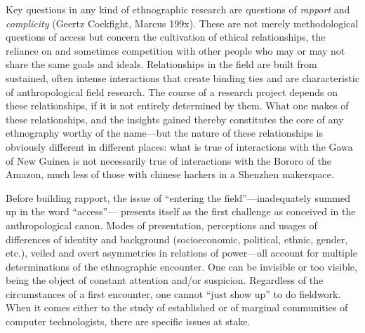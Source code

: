 \documentclass[10pt,letter,oneside]{scrartcl}
\begin{document}


Key questions in any kind of ethnographic research are questions of
\emph{rapport} and \emph{complicity} (Geertz Cockfight, Marcus 199x).  These are not
merely methodological questions of access but concern the cultivation
of ethical relationships, the reliance on and sometimes competition
with other people who may or may not share the same goals and
ideals.  Relationships in the field are built from sustained, often intense
interactions that create binding ties and are
characteristic of anthropological field research. The course of a
research project depends on these relationships, if it is not entirely 
determined by them.  What one makes of these relationships, and the
insights gained thereby constitutes the core of any ethnography worthy
of the name---but the nature of these relationships is obviously
different in different places:  what is true of interactions with the
Gawa of New Guinea is not necessarily true of interactions with the
Bororo of the Amazon, much less of those with chinese hackers in a
Shenzhen makerspace. 

Before building rapport, the issue of ``entering the
field''---inadequately summed up in the word ``access''--- presents
itself as the first challenge as conceived in the anthropological
canon.  Modes of presentation, perceptions and usages of differences
of identity and background (socioeconomic, political, ethnic, gender,
etc.), veiled and overt asymmetries in relations of power---all
account for multiple determinations of the ethnographic encounter. One
can be invisible or too visible, being the object of constant
attention and/or suspicion. Regardless of the circumstances of a first
encounter, one cannot ``just show up'' to do fieldwork.  When it comes
either to the study of established or of marginal communities of
computer technologists, there are specific issues at stake. 
\end{document}
